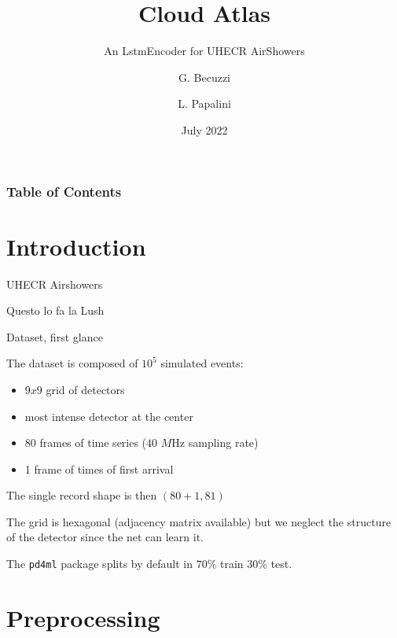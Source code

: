 \documentclass{beamer}
\title[Cloud Atlas] %
{Cloud Atlas}
\subtitle{An LstmEncoder for UHECR AirShowers}
\author[Gianluca Becuzzi, Lucia Papalini] %
{G. Becuzzi \and L. Papalini}
\date[July 2022] %
{July 2022}
\begin{document}
\frame{\titlepage}


\begin{frame}
\frametitle{Table of Contents}
\tableofcontents
\end{frame}


\section{Introduction}

\begin{frame}{UHECR Airshowers}

Questo lo fa la Lush

\end{frame}



\begin{frame}{Dataset, first glance}

    The dataset is composed of $10^5$ simulated events:

    \begin{itemize}
        \item $9 x 9$ grid of detectors
        \item most intense detector at the center 
        \item 80 frames of time series ($40$ $M$Hz sampling rate)
        \item 1 frame of times of first arrival 
    \end{itemize}

    The single record shape is then $(80 + 1 , 81)$

    The grid is hexagonal (adjacency matrix available) but we neglect the structure
    of the detector since the net can learn it.


    The \texttt{pd4ml} package splits by default in $70\%$ train $30\%$ test.

\end{frame}


\section{Preprocessing}
\end{document}
